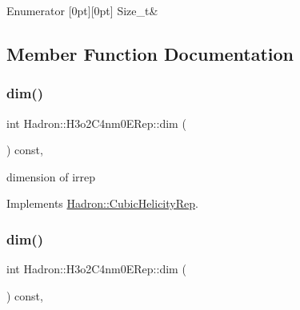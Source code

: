\begin{DoxyEnumFields}{Enumerator}
[0pt][0pt]{}\mbox{\label{structHadron_1_1H3o2C4nm0ERep_a273192d2f365e69dedc3bbfbdc10efc0a30eab1e8cea4a77e5ca381264b1d194f}} 
Size\+\_\+t&\\
\hline

\end{DoxyEnumFields}


\subsection{Member Function Documentation}
\mbox{\label{structHadron_1_1H3o2C4nm0ERep_a7ee17e5a57ef66d6ed9343f61a10721b}} 
\subsubsection{\texorpdfstring{dim()}{dim()}\hspace{0.1cm}{\footnotesize\ttfamily [1/3]}}
{\footnotesize\ttfamily int Hadron\+::\+H3o2\+C4nm0\+E\+Rep\+::dim (\begin{DoxyParamCaption}{ }\end{DoxyParamCaption}) const\hspace{0.3cm}{\ttfamily [inline]}, {\ttfamily [virtual]}}

dimension of irrep 

Implements \mbox{\hyperlink{structHadron_1_1CubicHelicityRep_a95d229a05580e65f8bdde74a1e316855}{Hadron\+::\+Cubic\+Helicity\+Rep}}.

\mbox{\label{structHadron_1_1H3o2C4nm0ERep_a7ee17e5a57ef66d6ed9343f61a10721b}} 
\subsubsection{\texorpdfstring{dim()}{dim()}\hspace{0.1cm}{\footnotesize\ttfamily [2/3]}}
{\footnotesize\ttfamily int Hadron\+::\+H3o2\+C4nm0\+E\+Rep\+::dim (\begin{DoxyParamCaption}{ }\end{DoxyParamCaption}) const\hspace{0.3cm}{\ttfamily [inline]}, {\ttfamily [virtual]}}

